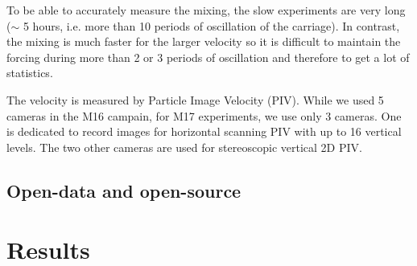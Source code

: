 To be able to accurately measure the mixing, the slow experiments are very long
($\sim$ 5 hours, i.e. more than 10 periods of oscillation of the carriage). In
contrast, the mixing is much faster for the larger velocity so it is difficult
to maintain the forcing during more than 2 or 3 periods of oscillation and
therefore to get a lot of statistics.

The velocity is measured by Particle Image Velocity (PIV). While we used 5
cameras in the M16 campain, for M17 experiments, we use only 3 cameras. One is
dedicated to record images for horizontal scanning PIV with up to 16 vertical
levels. The two other cameras are used for stereoscopic vertical 2D PIV.



\subsection{Open-data and open-source}



%
%
%
%
%


\section{Results}

